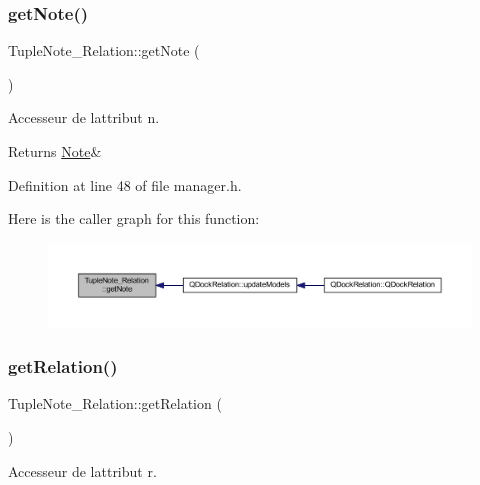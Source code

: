 \subsubsection{\texorpdfstring{get\+Note()}{getNote()}}
{\footnotesize\ttfamily Tuple\+Note\+\_\+\+Relation\+::get\+Note (\begin{DoxyParamCaption}{ }\end{DoxyParamCaption})\hspace{0.3cm}{\ttfamily [inline]}}



Accesseur de l\textquotesingle{}attribut n. 

\begin{DoxyReturn}{Returns}
\hyperlink{class_note}{Note}\& 
\end{DoxyReturn}


Definition at line 48 of file manager.\+h.

Here is the caller graph for this function\+:\nopagebreak
\begin{figure}[H]
\begin{center}
\leavevmode
\includegraphics[width=350pt]{class_tuple_note___relation_a8a3f889d3198a14629e1cabd74985c6d_icgraph}
\end{center}
\end{figure}
\mbox{\label{class_tuple_note___relation_ad326a5fee3d7bec52bda9e0234377d8e}} 
\subsubsection{\texorpdfstring{get\+Relation()}{getRelation()}}
{\footnotesize\ttfamily Tuple\+Note\+\_\+\+Relation\+::get\+Relation (\begin{DoxyParamCaption}{ }\end{DoxyParamCaption})\hspace{0.3cm}{\ttfamily [inline]}}



Accesseur de l\textquotesingle{}attribut r. 

